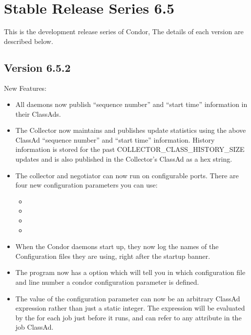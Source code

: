 \section{\label{sec:History-6-5}Stable Release Series 6.5}

This is the development release series of Condor,
The details of each version are described below.

\subsection{\label{sec:New-6-5-2}Version 6.5.2}

\noindent New Features:
\begin{itemize}

\item All daemons now publish ``sequence number'' and ``start time''
information in their ClassAds.

\item The Collector now maintains and publishes update statistics
using the above ClassAd ``sequence number'' and ``start time''
information.  History information is stored for the past
COLLECTOR\_CLASS\_HISTORY\_SIZE updates and is also published in the
Collector's ClassAd as a hex string.

\item The collector and negotiator can now run on configurable
 ports. There are four new configuration parameters you can use:

  \begin{itemize}
  \item {}
  \item {}
  \item {}
  \item {}
  \end{itemize}

\item When the Condor daemons start up, they now log the names of the
Configuration files they are using, right after the startup banner.

\item The  program now has a  option
  which will tell you in which configuration file and line number a
  condor configuration parameter is defined.

\item The value of the  configuration
      parameter can now be an arbitrary ClassAd expression rather than
      just a static integer.  The expression will be evaluated by the
       for each job just before it runs, and can refer
      to any attribute in the job ClassAd.

\end{itemize}

